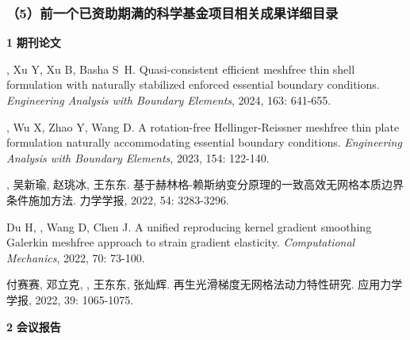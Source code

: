 \subsubsection*{\bfseries （5）前一个已资助期满的科学基金项目相关成果详细目录}

\noindent\textcircled{\textbf{\small 1}}
\textbf{期刊论文}

\vspace{-50pt}
\begin{thebibliography}{1}
	, Xu Y, Xu B, Basha S~H.
	\newblock Quasi-consistent efficient meshfree thin shell formulation with
	  naturally stabilized enforced essential boundary conditions.
	\newblock \emph{Engineering Analysis with Boundary Elements}, 2024, 163:
	  641-655.

	, Wu X, Zhao Y, Wang D.
	\newblock A rotation-free {{Hellinger-Reissner}} meshfree thin plate
	  formulation naturally accommodating essential boundary conditions.
	\newblock \emph{Engineering Analysis with Boundary Elements}, 2023, 154:
	  122-140.

	\textbf{}, 吴新瑜, 赵珧冰, 王东东.
	\newblock
	  {基于赫林格-赖斯纳变分原理的一致高效无网格本质边界条件施加方法}.
	\newblock 力学学报, 2022, 54: 3283-3296.

	Du H, , Wang D, Chen J.
	\newblock A unified reproducing kernel gradient smoothing {{Galerkin}} meshfree
	  approach to strain gradient elasticity.
	\newblock \emph{Computational Mechanics}, 2022, 70: 73-100.

	付赛赛, 邓立克, \textbf{}, 王东东, 张灿辉.
	\newblock 再生光滑梯度无网格法动力特性研究.
	\newblock 应用力学学报, 2022, 39: 1065-1075.

\end{thebibliography}

\noindent\textcircled{\textbf{\small 2}}
\textbf{会议报告}

